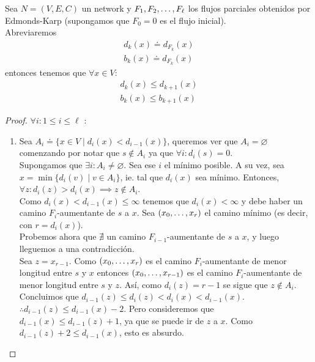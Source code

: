 \begin{lemma}\label{distancias_no_decrecen_EK}
  Sea $N=(V,E,C)$ un network y $F_1, F_2, \mathellipsis, F_\ell$ los flujos 
  parciales obtenidos por Edmonds-Karp (supongamos que $F_0 = 0$ es el flujo inicial).\\
  Abreviaremos
  \begin{align}
    d_k(x) \doteq d_{F_k}(x) \\
    b_k(x) \doteq d_{F_k}(x)
  \end{align} entonces tenemos que $\forall x \in V$:
  \begin{align}
    d_k(x) \le d_{k+1}(x) \\
    b_k(x) \le b_{k+1}(x)
  \end{align}
\end{lemma}

\begin{proof}
  $\forall i : 1 \le i \le \ell$ :\\
  \begin{enumerate}
  \item
    Sea $A_i \doteq \{x \in V \mid d_i(x) < d_{i-1}(x)\}$, queremos ver que 
    $A_i = \varnothing$ comenzando por notar que $s \notin A_i$ ya que $\forall i: d_i(s) = 0$.\\
    Supongamos que $\exists i : A_i \neq \varnothing$. Sea ese $i$ el mínimo posible. 
    A su vez, sea $x = \min\{d_i(v) \mid v \in A_i \}$, ie. tal que $d_i(x)$ sea mínimo. 
    Entonces, $\forall z : d_i(z) > d_i(x) \implies z\notin A_i$.\\
    Como $d_i(x) < d_{i-1}(x) \le \infty$ tenemos que $d_i(x) < \infty$ y debe 
    haber un camino $F_i$-aumentante de $s$ a $x$. 
    Sea $(x_0, \mathellipsis, x_r)$ el camino mínimo (es decir, con $r = d_i(x)$).\\
    Probemos ahora que $\nexists$ un camino $F_{i-1}$-aumentante de $s$ a $x$, 
    y luego lleguemos a una contradicción.\\
    Sea $z = x_{r-1}$. Como $(x_0,\mathellipsis, x_r)$ es el camino 
    $F_i$-aumentante de menor longitud entre $s$ y $x$ entonces 
    $(x_0, \mathellipsis, x_{r-1})$ es el camino $F_{i}$-aumentante de menor 
    longitud entre $s$ y $z$. Así, como $d_i(z) = r-1$ se sigue que $z \notin A_i$. 
    Concluimos que $d_{i-1}(z) \le d_i(z) < d_i(x) < d_{i-1}(x)$. \\
    $\therefore d_{i-1}(z) \le d_{i-1}(x)-2$.
    Pero consideremos que $d_{i-1}(x) \le d_{i-1}(z) + 1$, ya que se puede ir de $z$ a $x$.
    Como $d_{i-1}(z)+2 \le d_{i-1}(x)$, esto es absurdo.\\

\end{enumerate}
\end{proof}
